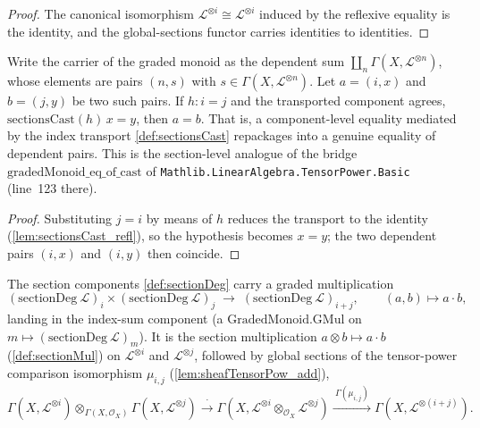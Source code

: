 \begin{proof}
  \leanok

  The canonical isomorphism
  \(\mathcal{L}^{\otimes i} \cong \mathcal{L}^{\otimes i}\) induced by the
  reflexive equality is the identity, and the global-sections functor carries
  identities to identities.
\end{proof}

\begin{lemma}
  \label{lem:gradedMonoid_eq_of_cast}
  Write the carrier of the graded monoid as the dependent sum
  \(\coprod_{n} \Gamma(X, \mathcal{L}^{\otimes n})\), whose elements are pairs
  \((n, s)\) with \(s \in \Gamma(X, \mathcal{L}^{\otimes n})\). Let
  \(a = (i, x)\) and \(b = (j, y)\) be two such pairs. If \(h : i = j\) and the
  transported component agrees, \(\mathrm{sectionsCast}(h)\,x = y\), then
  \(a = b\). That is, a component-level equality mediated by the index transport
  \cref{def:sectionsCast} repackages into a genuine equality of dependent pairs.
  This is the section-level analogue of the bridge
  \(\mathrm{gradedMonoid\_eq\_of\_cast}\) of
  \texttt{Mathlib.LinearAlgebra.TensorPower.Basic} (line~123 there).
\end{lemma}

\begin{proof}
  \leanok
  Substituting \(j = i\) by means of \(h\) reduces the transport to the identity
  (\cref{lem:sectionsCast_refl}), so the hypothesis becomes \(x = y\); the two
  dependent pairs \((i, x)\) and \((i, y)\) then coincide.
\end{proof}

\begin{definition}
  \label{def:sectionGradedGMul}
  The section components \cref{def:sectionDeg} carry a graded multiplication
  \[
    (\mathrm{sectionDeg}\ \mathcal{L})_i \times
      (\mathrm{sectionDeg}\ \mathcal{L})_j
    \;\longrightarrow\; (\mathrm{sectionDeg}\ \mathcal{L})_{i+j},
    \qquad (a, b) \longmapsto a \cdot b,
  \]
  landing in the index-sum component (a \(\mathrm{GradedMonoid.GMul}\) on
  \(m \mapsto (\mathrm{sectionDeg}\ \mathcal{L})_m\)). It is the section
  multiplication \(a \otimes b \mapsto a \cdot b\) (\cref{def:sectionMul}) on
  \(\mathcal{L}^{\otimes i}\) and \(\mathcal{L}^{\otimes j}\), followed by global
  sections of the tensor-power comparison isomorphism \(\mu_{i,j}\)
  (\cref{lem:sheafTensorPow_add}),
  \[
    \Gamma(X, \mathcal{L}^{\otimes i}) \otimes_{\Gamma(X,\mathcal{O}_X)}
      \Gamma(X, \mathcal{L}^{\otimes j})
    \xrightarrow{\ \cdot\ }
    \Gamma(X, \mathcal{L}^{\otimes i} \otimes_{\mathcal{O}_X}
      \mathcal{L}^{\otimes j})
    \xrightarrow{\ \Gamma(\mu_{i,j})\ }
    \Gamma(X, \mathcal{L}^{\otimes (i+j)}).
  \]
\end{definition}

